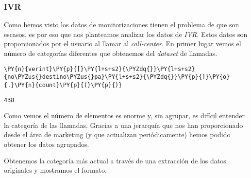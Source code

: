     \hypertarget{ivr}{%
\subsubsection{IVR}\label{ivr}}

    Como hemos visto los datos de monitorizaciones tienen el problema de que
son escasos, es por eso que nos planteamos analizar los datos de \textit{IVR}.
Estos datos son proporcionados por el usuario al llamar al \emph{call-center}. En primer lugar vemos el número de categorías diferentes que obtenemos del \textit{dataset} de llamadas.

\vspace{0.5cm}

    \begin{tcolorbox}[breakable, size=fbox, boxrule=1pt, pad at break*=1mm,colback=cellbackground, colframe=cellborder]
\begin{Verbatim}[commandchars=\\\{\}]
\PY{n}{verint}\PY{p}{[}\PY{l+s+s2}{\PYZdq{}}\PY{l+s+s2}{no\PYZus{}destino\PYZus{}pa}\PY{l+s+s2}{\PYZdq{}}\PY{p}{]}\PY{o}{.}\PY{n}{count}\PY{p}{(}\PY{p}{)}
\end{Verbatim}
\end{tcolorbox}

            \begin{tcolorbox}[breakable, size=fbox, boxrule=.5pt, pad at break*=1mm, opacityfill=0]
\begin{Verbatim}[commandchars=\\\{\}]
438
\end{Verbatim}
\end{tcolorbox}
        
    Como vemos el número de elementos es enorme y, sin agrupar, es difícil entender la categoría de las llamadas. Gracias a una jerarquía que nos han proporcionado desde el área de marketing (y que actualizan periódicamente) hemos podido obtener los datos agrupados. 
    
    Obtenemos la categoría más actual a través de una extracción de los datos originales y mostramos el formato.
    
    \vspace{0.5cm}

